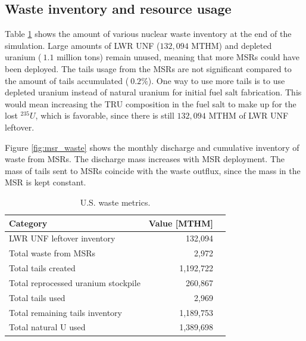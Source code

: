 \subsection{Waste inventory and resource usage}

Table \ref{tab:us_waste} shows the amount of various nuclear waste
inventory at the end of the simulation. Large amounts of \gls{LWR}
\gls{UNF} ($132,094$ MTHM) and depleted uranium ($~1.1$ million tons)
remain unused, meaning that more \glspl{MSR} could have been deployed.
The tails usage from the \glspl{MSR} are not significant compared to
the amount of tails accumulated ($~0.2\%$). One way to use more tails
is to use depleted uranium instead of natural uranium for initial
fuel salt fabrication. This would mean increasing the \gls{TRU} composition
in the fuel salt to make up for the lost $^{235}U$, which is favorable,
since there is still $132,094$ MTHM of \gls{LWR} \gls{UNF} leftover.

Figure \ref{fig:msr_waste} shows the monthly discharge and cumulative
inventory of waste from \glspl{MSR}. The discharge mass increases with
\gls{MSR} deployment. The mass of tails sent to \glspl{MSR} coincide
with the waste outflux, since the mass in the \gls{MSR} is kept constant.

\begin{table}[h]
	\centering
	\caption{U.S. waste metrics.}
	\begin{tabular}{lrl}
		\hline
		\textbf{Category} & \textbf{Value [MTHM]} \\
		\hline
			\gls{LWR} \gls{UNF} leftover inventory & 132,094 \\
			Total waste from \gls{MSR}s & 2,972 \\
			Total tails created & 1,192,722 \\
			Total reprocessed uranium stockpile & 260,867 \\
			Total tails used & 2,969 \\
			Total remaining tails inventory & 1,189,753 \\
			Total natural U used & 1,389,698 \\
		\hline
	\end{tabular}
	\label{tab:us_waste}
\end{table}


